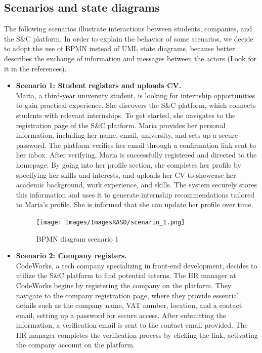 \newpage
\subsection{Scenarios and state diagrams}
The following scenarios illustrate interactions between students, companies, and the S\&C platform.
In order to explain the behavior of some scenarios, we decide to adopt the use of BPMN instead of UML state diagrams, because better describes the exchange of information and messages between the actors (Look for it in the references).

\begin{itemize}
    \item \textbf{Scenario 1: Student registers and uploads CV.}  \\
    Maria, a third-year university student, is looking for internship opportunities to gain practical experience. She discovers the S\&C platform, which connects students with relevant internships. To get started, she navigates to the registration page of the S\&C platform. Maria provides her personal information, including her name, email, university, and sets up a secure password. The platform verifies her email through a confirmation link sent to her inbox. After verifying, Maria is successfully registered and directed to the homepage. By going into her profile section, she completes her profile by specifying her skills and interests, and uploads her CV to showcase her academic background, work experience, and skills. The system securely stores this information and uses it to generate internship recommendations tailored to Maria’s profile. She is informed that she can update her profile over time.

    \begin{figure}[!ht]
    \centering
    \texttt{[image: Images/ImagesRASD/scenario\_1.png]}
    \caption{BPMN diagram scenario 1}
    \end{figure}

    \item \textbf{Scenario 2: Company registers.} \\
    CodeWorks, a tech company specializing in front-end development, decides to utilize the S\&C platform to find potential interns. The HR manager at CodeWorks begins by registering the company on the platform. They navigate to the company registration page, where they provide essential details such as the company name, VAT number, location, and a contact email, setting up a password for secure access. After submitting the information, a verification email is sent to the contact email provided. The HR manager completes the verification process by clicking the link, activating the company account on the platform.


\end{itemize}
